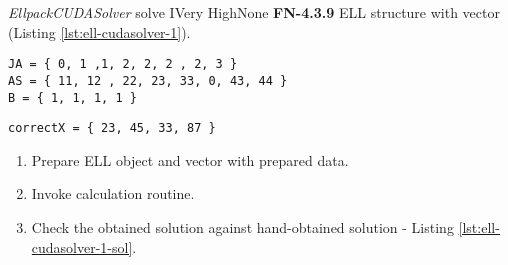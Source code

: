 \begin{testcase}{\emph{EllpackCUDASolver} solve I}{Very High}{None}
		{
			\textbf{FN-4.3.9}
		}
		{
			\gls{ELL} structure with vector (Listing \ref{lst:ell-cudasolver-1}).	
		}
		\begin{lstlisting}[label={lst:ell-cudasolver-1},caption={\gls{ELL} format and vector data example}, frame=single]
JA = { 0, 1 ,1, 2, 2, 2 , 2, 3 }
AS = { 11, 12 , 22, 23, 33, 0, 43, 44 }
B = { 1, 1, 1, 1 }
		\end{lstlisting}
		\begin{lstlisting}[label={lst:ell-cudasolver-1-sol},caption={\gls{ELL} format and vector data example}, frame=single]
correctX = { 23, 45, 33, 87 }
		\end{lstlisting}
		
		{	
			\begin{enumerate}
				\item Prepare \gls{ELL} object and vector with prepared data.
				\item Invoke calculation routine.
				\item
				{
					Check the obtained solution against hand-obtained solution - Listing \ref{lst:ell-cudasolver-1-sol}.
				}
			\end{enumerate}
		}
	\end{testcase}